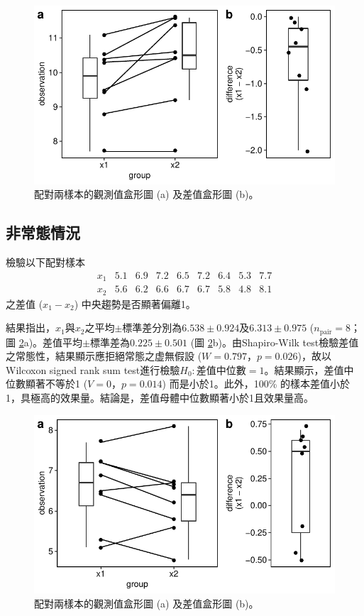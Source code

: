 \documentclass[12pt]{article}
\begin{document}
\begin{figure}[htb!]
	\centering
	\includegraphics[]{normal_paired_test.pdf}
	\caption{配對兩樣本的觀測值盒形圖 (a) 及差值盒形圖 (b)。}
	\label{fig:normal_paired_test}
\end{figure}

\subsection{非常態情況}
檢驗以下配對樣本
\[
\begin{matrix}
x_1 & 5.1 & 6.9 & 7.2 & 6.5 & 7.2 & 6.4 & 5.3 & 7.7 \\
x_2 & 5.6 & 6.2 & 6.6 & 6.7 & 6.7 & 5.8 & 4.8 & 8.1
\end{matrix}
\]
之差值 ($x_1 - x_2$) 中央趨勢是否顯著偏離1。

結果指出，$x_1$與$x_2$之平均$\pm$標準差分別為$6.538 \pm 0.924$及$6.313 \pm 0.975$ ($n_\mathrm{pair} = 8$；圖 \ref{fig:non-normal_paired_test}a)。差值平均$\pm$標準差為$0.225\pm0.501$ (圖 \ref{fig:non-normal_paired_test}b)。由Shapiro-Wilk test檢驗差值之常態性，結果顯示應拒絕常態之虚無假設 ($W = 0.797$，$p = 0.026$)，故以Wilcoxon signed rank sum test進行檢驗$H_0: \text{差值中位數}=1$。結果顯示，差值中位數顯著不等於1 ($V = 0$，$p = 0.014$) 而是小於1。此外，100\% 的樣本差值小於1，具極高的效果量。結論是，差值母體中位數顯著小於1且效果量高。

\begin{figure}[htb!]
	\centering
	\includegraphics[]{non-normal_paired_test.pdf}
	\caption{配對兩樣本的觀測值盒形圖 (a) 及差值盒形圖 (b)。}
	\label{fig:non-normal_paired_test}
\end{figure}
\end{document}
